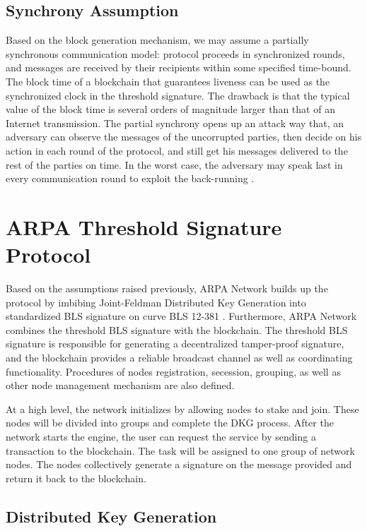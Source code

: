 \documentclass[11pt]{article}
\begin{document}
\subsection{Synchrony Assumption}

Based on the block generation mechanism, we may assume a partially synchronous communication model: protocol proceeds in synchronized rounds, and messages are received by their recipients within some specified time-bound. The block time of a blockchain that guarantees liveness can be used as the synchronized clock in the threshold signature. The drawback is that the typical value of the block time is several orders of magnitude larger than that of an Internet transmission. The partial synchrony opens up an attack way that, an adversary can observe the messages of the uncorrupted parties, then decide on his action in each round of the protocol, and still get his messages delivered to the rest of the parties on time. In the worst case, the adversary may speak last in every communication round to exploit the back-running \cite{gennaro2007secure}.

\section{ARPA Threshold Signature Protocol}

Based on the assumptions raised previously, ARPA Network builds up the protocol by imbibing Joint-Feldman Distributed Key Generation into standardized BLS signature \cite{irtf-cfrg-bls-signature-05} on curve BLS 12-381 \cite{sean2017bls}. Furthermore, ARPA Network combines the threshold BLS signature with the blockchain. The threshold BLS signature is responsible for generating a decentralized tamper-proof signature, and the blockchain provides a reliable broadcast channel as well as coordinating functionality. Procedures of nodes registration, secession, grouping, as well as other node management mechanism are also defined.

At a high level, the network initializes by allowing nodes to stake and join. These nodes will be divided into groups and complete the DKG process. After the network starts the engine, the user can request the service by sending a transaction to the blockchain. The task will be assigned to one group of network nodes. The nodes collectively generate a signature on the message provided and return it back to the blockchain.

\subsection{Distributed Key Generation}
\end{document}
